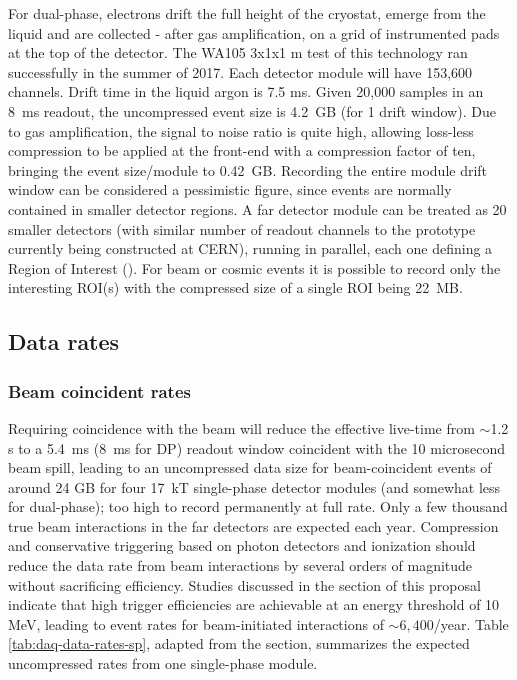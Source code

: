For dual-phase, electrons drift the full height of the cryostat, emerge from the liquid and are collected - after gas amplification, on a grid of instrumented pads at the top of the detector.  The WA105 3x1x1 m test of this technology ran successfully in the summer of 2017\cite{Murphy:20170516}. 
Each detector module will have 153,600 channels. Drift time in the liquid argon is 7.5 ms. Given 20,000 samples in an 8~ms readout, the uncompressed event size is 4.2~GB (for 1 drift window).  Due to gas amplification, the signal to noise ratio is quite high, allowing loss-less compression to be applied at the front-end  with a compression factor of ten, bringing the event size/module to 0.42~GB. Recording the entire module drift window can be considered a pessimistic figure, since events are normally contained in smaller detector regions. A  far detector module can be treated as 20 smaller  detectors (with similar number  of readout channels to the prototype currently being constructed at CERN), running in parallel, each one defining a Region of Interest  (). For beam or cosmic events it is possible to record only the interesting ROI(s) with the compressed size of a single ROI being 22~MB.

\subsection{Data rates}
\subsubsection{Beam coincident rates}

Requiring  coincidence with the  beam will reduce the effective live-time from $\sim$1.2 s  to a 5.4~ms (8~ms for DP)  readout window coincident with the 10 microsecond beam spill, leading to an uncompressed data size for beam-coincident events of around 24 GB for four 17~kT single-phase detector modules (and somewhat less for dual-phase); too high to record permanently at full rate.
Only a few thousand true beam interactions in the far detectors are expected each year.  Compression and conservative triggering based on photon detectors and ionization should reduce the data rate from beam interactions by several orders of magnitude without sacrificing efficiency.  Studies discussed in the  section of this proposal indicate that high trigger efficiencies are achievable at an energy threshold of 10 MeV, leading to event rates for beam-initiated  interactions of $\sim 6,400$/year.
Table \ref{tab:daq-data-rates-sp}, adapted from the  section, summarizes the expected uncompressed rates from one single-phase module. 

